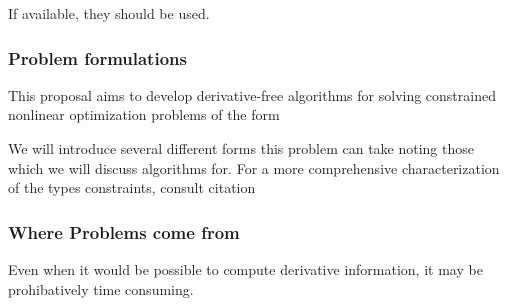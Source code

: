















If available, they should be used. 


\subsubsection{Problem formulations}

This proposal aims to develop derivative-free algorithms for solving constrained nonlinear optimization problems of the form

We will introduce several different forms this problem can take noting those which we will discuss algorithms for.
For a more comprehensive characterization of the types constraints, consult \color{red}citation\color{black} %


\subsubsection{Where Problems come from}








Even when it would be possible to compute derivative information, it may be prohibatively time consuming.




